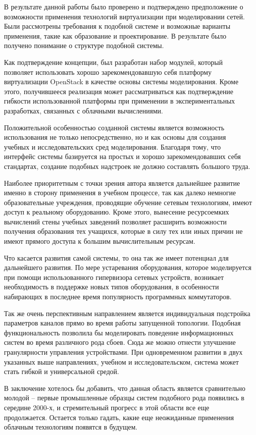 \conclusion

В результате данной работы было проверено и подтверждено предположение 
о возможности применения технологий виртуализации при моделировании сетей.
Были рассмотрены требования к подобной системе и возможные варианты 
применения, такие как образование и проектирование. В результате было
получено понимание о структуре подобной системы.

Как подтверждение концепции, был разработан набор модулей, который 
позволяет использовать хорошо зарекомендовавшую себя платформу
виртуализации OpenStack в качестве основы системы моделирования.
Кроме этого, получившееся реализация может рассматриваться как подтверждение
гибкости использованной платформы при применении в экспериментальных
разработках, связанных с облачными вычислениями.

Положительной особенностью созданной системы является возможность
использования не только непосредственно, но и как основы для создания
учебных и исследовательских сред моделирования. Благодаря тому, что
интерфейс системы базируется на простых и хорошо зарекомендовавших 
себя стандартах, создание подобных надстроек не должно составлять
большого труда.

Наиболее приоритетным с точки зрения автора является дальнейшее развитие
именно в сторону применения в учебном процессе, так как далеко немногие
образовательные учреждения, проводящие обучение сетевым технологиям,
имеют доступ к реальному оборудованию. Кроме этого, вынесение 
ресурсоемких вычислений стены учебных заведений позволяет расширить возможности
получения образования тех учащихся, которые в силу тех или иных причин не 
имеют прямого доступа  к большим вычислительным ресурсам.

Что касается развития самой системы, то она так же имеет потенциал для дальнейшего
развития. По мере устаревания оборудования, которое моделируется при помощи
использованного гипервизора сетевых устройств, возникает необходимость в поддержке
новых типов оборудования, в особенности набирающих в последнее время популярность
программных коммутаторов. 

Так же очень перспективным направлением является индивидуальная подстройка
параметров каналов прямо во время работы запущенной топологии. Подобная 
функциональность позволила бы моделировать поведение информационных систем во 
время различного рода сбоев. Сюда же можно отнести улучшение гранулярности
управления устройствами. При одновременном развитии в двух указанных выше 
направлениях, учебном и исследовательском, система может стать гибкой
и универсальной средой.

В заключение хотелось бы добавить, что данная область является сравнительно молодой --
первые промышленные образцы систем подобного рода появились в середине
2000-х, и стремительный прогресс в этой области все еще продолжается. Остается
только гадать, какие еще неожиданные применения облачным технологиям появятся в будущем.

